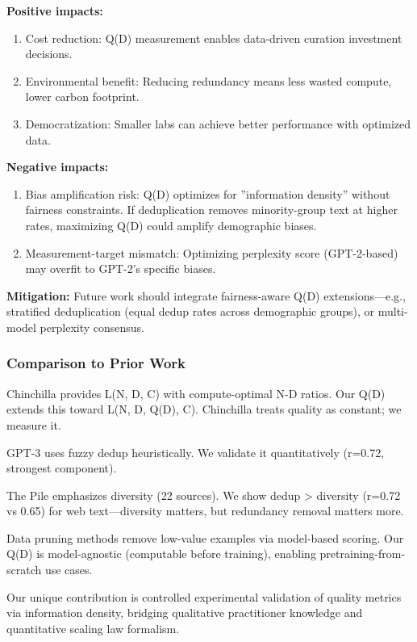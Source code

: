 \textbf{Positive impacts:}

\begin{enumerate}
\item Cost reduction: Q(D) measurement enables data-driven curation investment decisions.
\item Environmental benefit: Reducing redundancy means less wasted compute, lower carbon footprint.
\item Democratization: Smaller labs can achieve better performance with optimized data.
\end{enumerate}

\textbf{Negative impacts:}

\begin{enumerate}
\item Bias amplification risk: Q(D) optimizes for ''information density'' without fairness constraints. If deduplication removes minority-group text at higher rates, maximizing Q(D) could amplify demographic biases.
\item Measurement-target mismatch: Optimizing perplexity score (GPT-2-based) may overfit to GPT-2's specific biases.
\end{enumerate}

\textbf{Mitigation:} Future work should integrate fairness-aware Q(D) extensions---e.g., stratified deduplication (equal dedup rates across demographic groups), or multi-model perplexity consensus.

\subsubsection{Comparison to Prior Work}

Chinchilla provides L(N, D, C) with compute-optimal N-D ratios. Our Q(D) extends this toward L(N, D, Q(D), C). Chinchilla treats quality as constant; we measure it.

GPT-3 uses fuzzy dedup heuristically. We validate it quantitatively (r=0.72, strongest component).

The Pile emphasizes diversity (22 sources). We show dedup > diversity (r=0.72 vs 0.65) for web text---diversity matters, but redundancy removal matters more.

Data pruning methods remove low-value examples via model-based scoring. Our Q(D) is model-agnostic (computable before training), enabling pretraining-from-scratch use cases.

Our unique contribution is controlled experimental validation of quality metrics via information density, bridging qualitative practitioner knowledge and quantitative scaling law formalism.


